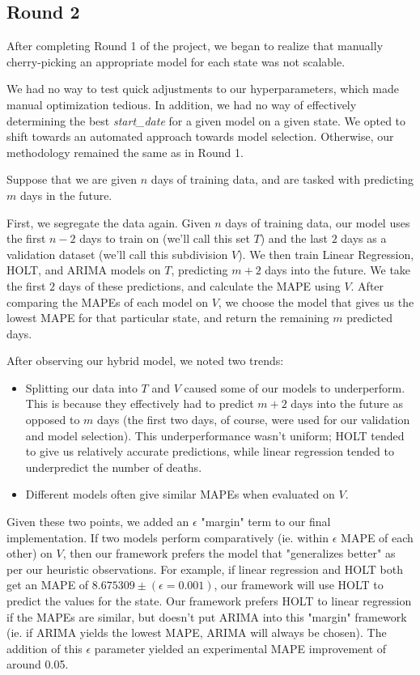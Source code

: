 \documentclass[sigconf,nonacm]{acmart}
\begin{document}
\subsection{Round 2}

After completing Round 1 of the project, we began to realize that manually
cherry-picking an appropriate model for each state was not scalable. 

We had no way to test quick adjustments to our hyperparameters, which made
manual optimization tedious. In addition, we had no way of effectively
determining the best \emph{start\_date} for a given model on a given state. 
We opted to shift towards an automated approach towards model selection. 
Otherwise, our methodology remained the same as in Round 1. 

Suppose that we are given $n$ days of training data, and are tasked with
predicting $m$ days in the future. 

First, we segregate the data again. Given $n$ days of training data, our model
uses the first $n-2$ days to train on (we'll call this set $T$) and the last
$2$ days as a validation dataset (we'll call this subdivision $V$). We then
train Linear Regression, HOLT, and ARIMA models on $T$, predicting $m+2$ days
into the future. We take the first $2$ days of these predictions, and calculate
the MAPE using $V$. After comparing the MAPEs of each model on $V$, we choose
the model that gives us the lowest MAPE for that particular state, and return
the remaining $m$ predicted days. 

After observing our hybrid model, we noted two trends: 
\begin{itemize}
\item 
Splitting our data into $T$ and $V$ caused some of our models to
underperform. This is because they effectively had to predict $m+2$ days into
the future as opposed to $m$ days (the first two days, of course, were used for
our validation and model selection). This underperformance wasn't uniform;
HOLT tended to give us relatively accurate predictions, while linear regression
tended to underpredict the number of deaths. 
\item
Different models often give similar MAPEs when evaluated on $V$. 
\end{itemize}

Given these two points, we added an $\epsilon$ "margin" term to our final
implementation. If two models perform comparatively (ie. within $\epsilon$ MAPE
of each other) on $V$, then our framework prefers the model that "generalizes
better" as per our heuristic observations. For example, if linear regression
and HOLT both get an MAPE of $8.675309 \pm (\epsilon = 0.001)$, our framework
will use HOLT to predict the values for the state. Our framework prefers HOLT
to linear regression if the MAPEs are similar, but doesn't put ARIMA into this
"margin" framework (ie. if ARIMA yields the lowest MAPE, ARIMA will always be
chosen). The addition of this $\epsilon$ parameter yielded an experimental 
MAPE improvement of around 0.05. 



\end{document}
